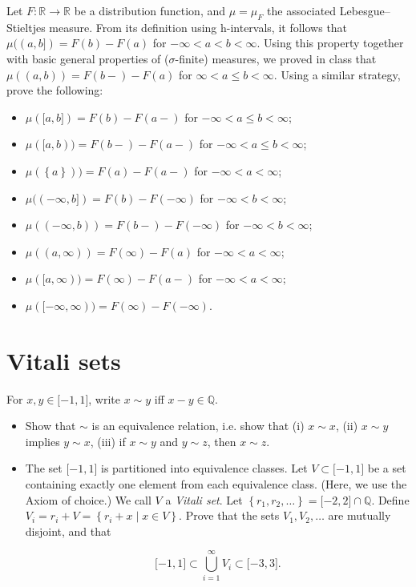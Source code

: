\documentclass{qlnotes-export}
\begin{document}
Let \(F:{\mathbb{R}}\rightarrow{\mathbb{R}}\) be a distribution function, and \(\mu = \mu_{F}\) the associated Lebesgue--Stieltjes measure. From its definition using h-intervals, it follows that \(\mu((a,b\rbrack) = F(b) - F(a)\) for \(- \infty < a < b < \infty\). Using this property together with basic general properties of (\(\sigma\)-finite) measures, we proved in class that \(\mu((a,b)) = F(b - ) - F(a)\) for \(\infty < a \leq b < \infty\). Using a similar strategy, prove the following:

\begin{itemize}
\item
  \(\mu(\lbrack a,b\rbrack) = F(b) - F(a - )\) for \(- \infty < a \leq b < \infty\);
\item
  \(\mu(\lbrack a,b)) = F(b - ) - F(a - )\) for \(- \infty < a \leq b < \infty\);
\item
  \(\mu(\left\{ a \right\})) = F(a) - F(a - )\) for \(- \infty < a < \infty\);
\item
  \(\mu(( - \infty,b\rbrack) = F(b) - F( - \infty)\) for \(- \infty < b < \infty\);
\item
  \(\mu(( - \infty,b)) = F(b - ) - F( - \infty)\) for \(- \infty < b < \infty\);
\item
  \(\mu((a,\infty)) = F(\infty) - F(a)\) for \(- \infty < a < \infty\);
\item
  \(\mu(\lbrack a,\infty)) = F(\infty) - F(a - )\) for \(- \infty < a < \infty\);
\item
  \(\mu(\lbrack - \infty,\infty)) = F(\infty) - F( - \infty)\).
\end{itemize}

\section{Vitali sets}\label{vitali-sets}

For \(x,y \in \lbrack - 1,1\rbrack\), write \(x \sim y\) iff \(x - y \in {\mathbb{Q}}\).

\begin{itemize}
\item
  Show that \(\sim\) is an equivalence relation, i.e. show that (i) \(x \sim x\), (ii) \(x \sim y\) implies \(y \sim x\), (iii) if \(x \sim y\) and \(y \sim z\), then \(x \sim z\).
\item
  The set \(\lbrack - 1,1\rbrack\) is partitioned into equivalence classes. Let \(V \subset \lbrack - 1,1\rbrack\) be a set containing exactly one element from each equivalence class. (Here, we use the Axiom of choice.) We call \(V\) a \emph{Vitali set}. Let \(\left\{ {r_{1},r_{2},\ldots} \right\} = \lbrack - 2,2\rbrack \cap {\mathbb{Q}}\). Define \(V_{i} = r_{i} + V = \left\{ {r_{i} + x \mid x \in V} \right\}\). Prove that the sets \(V_{1},V_{2},\ldots\) are mutually disjoint, and that

  \[\lbrack - 1,1\rbrack \subset \bigcup\limits_{i = 1}^{\infty}V_{i} \subset \lbrack - 3,3\rbrack.\]
\end{itemize}
\end{document}
